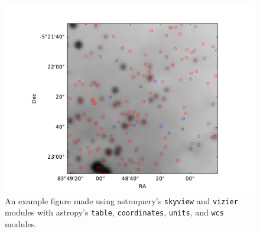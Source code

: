 \documentclass[twocolumn]{aastex61}
\begin{document}
\begin{figure}[!htp]
\includegraphics[scale=1,width=7in]{example_figure_1.pdf}
\caption{An example figure made using astroquery's \texttt{skyview} and
\texttt{vizier} modules with astropy's \texttt{table}, \texttt{coordinates},
\texttt{units}, and \texttt{wcs} modules.}
\label{fig:example1}
\end{figure}
\end{document}
